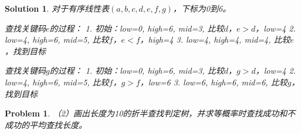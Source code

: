 \documentclass[12pt,a4paper]{amsart}
\newtheorem{problem}{Problem}[section]
\newtheorem{solution}{Solution}[section]
\begin{document}
\begin{solution}
对于有序线性表$(a,b,c,d,e,f,g)$，下标为0到6。

查找关键码$e$的过程：
1. 初始：low=0, high=6, mid=3, 比较$d$，$e>d$，low=4
2. low=4, high=6, mid=5, 比较$f$，$e<f$，high=4  
3. low=4, high=4, mid=4, 比较$e$，找到目标

查找关键码$g$的过程：
1. 初始：low=0, high=6, mid=3, 比较$d$，$g>d$，low=4
2. low=4, high=6, mid=5, 比较$f$，$g>f$，low=6
3. low=6, high=6, mid=6, 比较$g$，找到目标

\begin{center}
\end{center}
\end{solution}

\begin{problem}
（2）画出长度为10的折半查找判定树，并求等概率时查找成功和不成功的平均查找长度。
\end{problem}
\end{document}
